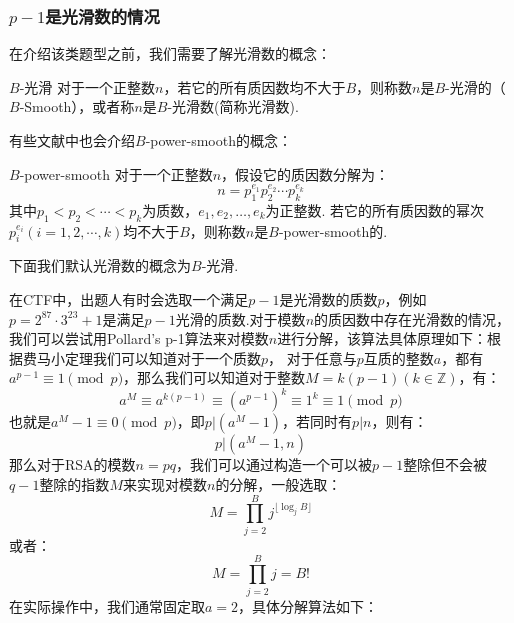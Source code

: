 \documentclass{book}
\numberwithin{equation}{subsubsection}
\begin{document}
\subsubsection{$p-1$是光滑数的情况}
在介绍该类题型之前，我们需要了解光滑数的概念：

\begin{concept}{$B$-光滑}
对于一个正整数$n$，若它的所有质因数均不大于$B$，则称数$n$是$B$-光滑的（$B$-Smooth），或者称$n$是$B$-光滑数(简称光滑数).\par
\end{concept}

有些文献中也会介绍$B$-power-smooth的概念：

\begin{concept}{$B$-power-smooth}
对于一个正整数$n$，假设它的质因数分解为：
\begin{equation}
    n = p_1^{e_1}p_2^{e_2}\cdots p_k^{e_k}
    \nonumber
\end{equation}
其中$p_1<p_2<\cdots<p_k$为质数，$e_1,e_2,\ldots,e_k$为正整数.
若它的所有质因数的幂次$p_i^{e_i}(i=1,2,\cdots,k)$均不大于$B$，则称数$n$是$B$-power-smooth的.\par
\end{concept}

下面我们默认光滑数的概念为$B$-光滑.\par

在CTF中，出题人有时会选取一个满足$p-1$是光滑数的质数$p$，例如$p=2^{87}\cdot3^{23}+1$是满足$p-1$光滑的质数.对于模数$n$的质因数中存在光滑数的情况，我们可以尝试用Pollard's p-1算法来对模数$n$进行分解，该算法具体原理如下：根据费马小定理我们可以知道对于一个质数$p$，
对于任意与$p$互质的整数$a$，都有$a^{p-1}\equiv 1\pmod{p}$，那么我们可以知道对于整数$M=k(p-1)(k\in\mathbb{Z})$，有：
\begin{equation}
    a^M\equiv a^{k(p-1)}\equiv (a^{p-1})^k\equiv 1^k\equiv 1\pmod{p}
    \nonumber
\end{equation}
也就是$a^{M}-1\equiv 0\pmod{p}$，即$p|(a^{M}-1)$，若同时有$p|n$，则有：
\begin{equation}
    p|(a^{M}-1,n)
    \nonumber
\end{equation}
那么对于RSA的模数$n=pq$，我们可以通过构造一个可以被$p-1$整除但不会被$q-1$整除的指数$M$来实现对模数$n$的分解，一般选取：
\begin{equation}
    M=\prod_{j=2}^{B}j^{\lfloor \log_j B \rfloor}
    \nonumber
\end{equation}
或者：
\begin{equation}
    M=\prod_{j=2}^{B}j=B!
    \nonumber
\end{equation}
在实际操作中，我们通常固定取$a=2$，具体分解算法如下：\par
\end{document}
